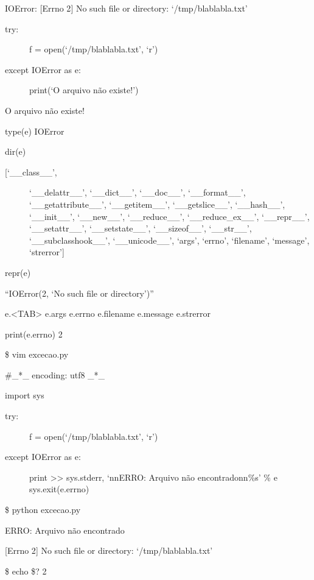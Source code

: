 \documentclass[letterpaper,10pt,brazil]{sphinxmanual}
\begin{document}
IOError: {[}Errno 2{]} No such file or directory: ‘/tmp/blablabla.txt’
\begin{description}
\item[{try:}] \leavevmode
f = open(‘/tmp/blablabla.txt’, ‘r’)

\item[{except IOError as e:}] \leavevmode
print(‘O arquivo não existe!’)

\end{description}

O arquivo não existe!

type(e)
IOError

dir(e)
\begin{description}
\item[{{[}‘\_\_class\_\_’,}] \leavevmode
‘\_\_delattr\_\_’,
‘\_\_dict\_\_’,
‘\_\_doc\_\_’,
‘\_\_format\_\_’,
‘\_\_getattribute\_\_’,
‘\_\_getitem\_\_’,
‘\_\_getslice\_\_’,
‘\_\_hash\_\_’,
‘\_\_init\_\_’,
‘\_\_new\_\_’,
‘\_\_reduce\_\_’,
‘\_\_reduce\_ex\_\_’,
‘\_\_repr\_\_’,
‘\_\_setattr\_\_’,
‘\_\_setstate\_\_’,
‘\_\_sizeof\_\_’,
‘\_\_str\_\_’,
‘\_\_subclasshook\_\_’,
‘\_\_unicode\_\_’,
‘args’,
‘errno’,
‘filename’,
‘message’,
‘strerror’{]}

\end{description}

repr(e)

“IOError(2, ‘No such file or directory’)”

e.\textless{}TAB\textgreater{}
e.args      e.errno     e.filename  e.message   e.strerror

print(e.errno)
2

\$ vim excecao.py

\#\_*\_ encoding: utf\sphinxhyphen{}8 \_*\_

import sys
\begin{description}
\item[{try:}] \leavevmode
f = open(‘/tmp/blablabla.txt’, ‘r’)

\item[{except IOError as e:}] \leavevmode
print \textgreater{}\textgreater{} sys.stderr, ‘nnERRO: Arquivo não encontradonn\%s’ \% e
sys.exit(e.errno)

\end{description}

\$ python excecao.py

ERRO: Arquivo não encontrado

{[}Errno 2{]} No such file or directory: ‘/tmp/blablabla.txt’

\$ echo \$?
2
\end{document}
